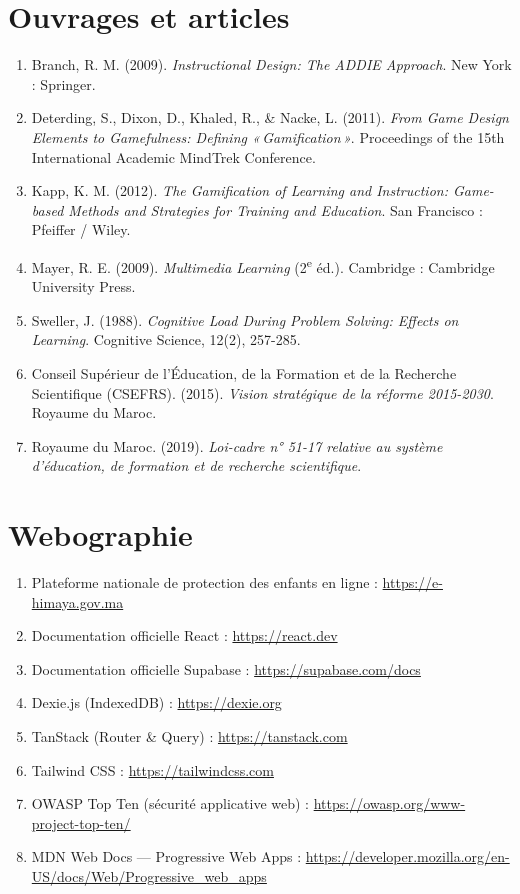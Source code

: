 \documentclass[12pt, a4paper, oneside]{report}
\begin{document}

\section*{Ouvrages et articles}
\begin{enumerate}[leftmargin=*]
  \item Branch, R. M. (2009). \textit{Instructional Design: The ADDIE Approach}. New York : Springer.
  \item Deterding, S., Dixon, D., Khaled, R., \& Nacke, L. (2011). \textit{From Game Design Elements to Gamefulness: Defining «\,Gamification\,»}. Proceedings of the 15th International Academic MindTrek Conference.
  \item Kapp, K. M. (2012). \textit{The Gamification of Learning and Instruction: Game-based Methods and Strategies for Training and Education}. San Francisco : Pfeiffer / Wiley.
  \item Mayer, R. E. (2009). \textit{Multimedia Learning} (2\textsuperscript{e} éd.). Cambridge : Cambridge University Press.
  \item Sweller, J. (1988). \textit{Cognitive Load During Problem Solving: Effects on Learning}. Cognitive Science, 12(2), 257-285.
  \item Conseil Supérieur de l'Éducation, de la Formation et de la Recherche Scientifique (CSEFRS). (2015). \textit{Vision stratégique de la réforme 2015-2030}. Royaume du Maroc.
  \item Royaume du Maroc. (2019). \textit{Loi-cadre n° 51-17 relative au système d'éducation, de formation et de recherche scientifique}.
\end{enumerate}

\section*{Webographie}
\begin{enumerate}[leftmargin=*]
  \item Plateforme nationale de protection des enfants en ligne : \url{https://e-himaya.gov.ma}
  \item Documentation officielle React : \url{https://react.dev}
  \item Documentation officielle Supabase : \url{https://supabase.com/docs}
  \item Dexie.js (IndexedDB) : \url{https://dexie.org}
  \item TanStack (Router \& Query) : \url{https://tanstack.com}
  \item Tailwind CSS : \url{https://tailwindcss.com}
  \item OWASP Top Ten (sécurité applicative web) : \url{https://owasp.org/www-project-top-ten/}
  \item MDN Web Docs — Progressive Web Apps : \url{https://developer.mozilla.org/en-US/docs/Web/Progressive_web_apps}
\end{enumerate}
\end{document}
